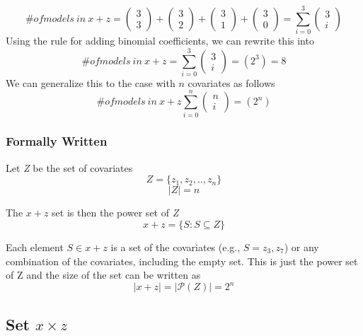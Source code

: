 \[\# of models\ in\ x + z = \left( \begin{array}{c}
3 \\ 
3 \end{array}
\right)+\left( \begin{array}{c}
3 \\ 
2 \end{array}
\right)+\left( \begin{array}{c}
3 \\ 
1 \end{array}
\right)+\left( \begin{array}{c}
3 \\ 
0 \end{array}
\right)=\sum^3_{i=0}{\left( \begin{array}{c}
3 \\ 
i \end{array}
\right)}\] 
Using the rule for adding binomial coefficients, we can rewrite this into
\[\# of models\ in\ x + z = \sum^3_{i=0}{\left( \begin{array}{c}
3 \\ 
i \end{array}
\right)}=\left(2^3\right)=8\] 
We can generalize this to the case with $n$ covariates  as follows 
\[\# of models\ in\ x + z\sum^n_{i=0}{\left( \begin{array}{c}
n \\ 
i \end{array}
\right)}=\left(2^n\right)\] 

\subsubsection{Formally Written} \break 
\noindent Let \emph{Z} be the set of covariates 
\[Z=\{\left.z_1,z_2,..,z_n\right.\}\] 
\[\left|Z\right|=n\] 


\noindent The $x + z$ set is then the power set of \emph{Z} 
\[x + z = \{\left.S:S\subseteq Z\right.\}\] 

Each element $S\in x + z$ is a set of the covariates (e.g., $S=\left.z_3,z_7\right.$) or any combination of the covariates, including the empty set. This is just the power set of Z and the size of the set can be written as
\[\left|x + z\right|=|\mathcal{P}\left(Z\right)|=2^n\] 

\subsection{Set $x \times z$}

